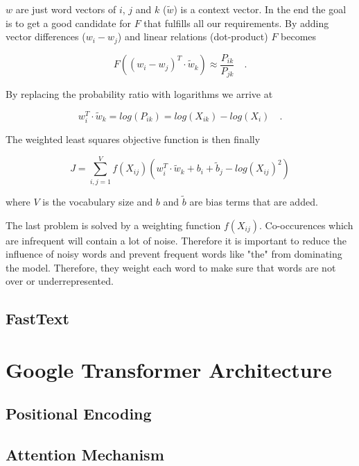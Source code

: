 $w$ are just word vectors of $i$, $j$ and $k$ {($\widetilde{w}$)} is a context vector. In the end the goal is to get a good candidate for $F$ that fulfills all our requirements. By adding vector differences {($w_i - w_j$)} and linear relations {(dot-product)} $F$ becomes

\begin{equation}
	F((w_i - w_j)^T \cdot \widetilde{w}_k) \approx \frac{P_{ik}}{P_{jk}} \quad .
\end{equation}

By replacing the probability ratio with logarithms we arrive at

\begin{equation}
	w_i^T \cdot \widetilde{w}_k = log(P_{ik}) = log(X_{ik}) - log(X_i) \quad .
\end{equation}

The weighted least squares objective function is then finally

\begin{equation}
	J = \sum_{i,j=1}^V f(X_{ij}) (w_i^T \cdot \widetilde{w}_k + b_i+\widetilde{b}_j - log(X_{ij})^2)
\end{equation}

where $V$ is the vocabulary size and $b$ and $\widetilde{b}$ are bias terms that are added.
\medskip

The last problem is solved by a weighting function $f(X_{ij})$. Co-occurences which are infrequent will contain a lot of noise. Therefore it is important to reduce the influence of noisy words and prevent frequent words like "the" from dominating the model. Therefore, they weight each word to make sure that words are not over or underrepresented.


\subsection{FastText}

\cite{Joulin2016}


\section{Google Transformer Architecture}
\subsection{Positional Encoding}
\subsection{Attention Mechanism}
